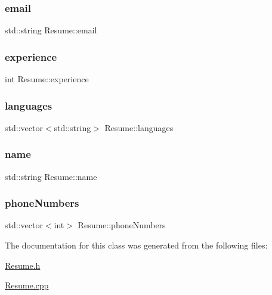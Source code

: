 \hypertarget{class_resume_a376e6779f0f414aec00ca78c36dd1c2a}{}\label{class_resume_a376e6779f0f414aec00ca78c36dd1c2a} 
\subsubsection{\texorpdfstring{email}{email}}
{\footnotesize\ttfamily std\+::string Resume\+::email\hspace{0.3cm}{\ttfamily [private]}}

\hypertarget{class_resume_af49c8b6d88d53bc168c7abd595b3faf9}{}\label{class_resume_af49c8b6d88d53bc168c7abd595b3faf9} 
\subsubsection{\texorpdfstring{experience}{experience}}
{\footnotesize\ttfamily int Resume\+::experience\hspace{0.3cm}{\ttfamily [private]}}

\hypertarget{class_resume_a4035be2ef3fb8fbdaf60ea05ef0868c3}{}\label{class_resume_a4035be2ef3fb8fbdaf60ea05ef0868c3} 
\subsubsection{\texorpdfstring{languages}{languages}}
{\footnotesize\ttfamily std\+::vector$<$std\+::string$>$ Resume\+::languages\hspace{0.3cm}{\ttfamily [private]}}

\hypertarget{class_resume_ae99dd9e5aa53753a02b105478a76214a}{}\label{class_resume_ae99dd9e5aa53753a02b105478a76214a} 
\subsubsection{\texorpdfstring{name}{name}}
{\footnotesize\ttfamily std\+::string Resume\+::name\hspace{0.3cm}{\ttfamily [private]}}

\hypertarget{class_resume_a82cc5431107459a181378b8ce3fbbb0d}{}\label{class_resume_a82cc5431107459a181378b8ce3fbbb0d} 
\subsubsection{\texorpdfstring{phone\+Numbers}{phoneNumbers}}
{\footnotesize\ttfamily std\+::vector$<$int$>$ Resume\+::phone\+Numbers\hspace{0.3cm}{\ttfamily [private]}}



The documentation for this class was generated from the following files\+:\begin{DoxyCompactItemize}
\item 
\hyperlink{_resume_8h}{Resume.\+h}\item 
\hyperlink{_resume_8cpp}{Resume.\+cpp}\end{DoxyCompactItemize}
